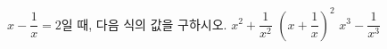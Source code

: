 $x-\dfrac{1}{x}=2$일 때, 다음 식의 값을 구하시오.
 $x^2+\dfrac{1}{x^2}$
 $\left(x+\dfrac{1}{x}\right)^2$
 $x^3-\dfrac{1}{x^3}$
